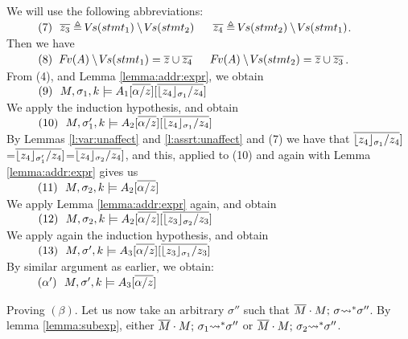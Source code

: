 {\begin{description}
We will use the following abbreviations: \\
$\SPS (7)\ \ \overline {z_3}\triangleq\vs(stmt_1)\setminus\vs(stmt_2) \ \ \ \ \ \overline {z_4}\triangleq\vs(stmt_2)\setminus\vs(stmt_1) $.\\
Then we have\\
$\SPS  (8)\ \ \fv(A)\setminus\vs(stmt_1) = \overline {z}\cup \overline{z_4}  \ \ \ \ \ 
\fv(A)\setminus\vs(stmt_2) = \overline {z}\cup\overline{z_3} $.
\\
 From (4), and Lemma \ref{lemma:addr:expr}, we obtain\\ 
 $\SPS (9) \ \ \satDAssertFrom M  {\sigma_1} k   {A_1[\overline{\alpha/z}][\overline{{\interpret {\sigma_1} {z_4}} /z_4}]}$\\
 We apply the induction hypothesis, and obtain\\
  $\SPS (10) \ \ \satDAssertFrom M  {\sigma_1'} k   {A_2[\overline{\alpha/z}][\overline{{\interpret {\sigma_1} {z_4}} /z_4}]}$\\
By Lemmas \ref{l:var:unaffect} and \ref{l:assrt:unaffect} and (7) we have that ${\overline{{\interpret {\sigma_1} {z_4}} /z_4}]}$=${\overline{{\interpret {\sigma_1'} {z_4}} /z_4}]}$=${\overline{{\interpret {\sigma_2} {z_4}} /z_4}]}$, and this, applied to (10) and again with Lemma \ref{lemma:addr:expr} gives us\\
 $\SPS (11) \ \ \satDAssertFrom M  {\sigma_2} k   {A_2[\overline{\alpha/z}]}$\\
We apply Lemma \ref{lemma:addr:expr} again, and obtain\\
 $\SPS (12) \ \ \satDAssertFrom M  {\sigma_2} k   {A_2[\overline{\alpha/z}][{\overline{{\interpret {\sigma_2} {z_3}} /z_3}}]}$\\
 We apply again the induction hypothesis, and obtain\\
  $\SPS (13) \ \ \satDAssertFrom M  {\sigma'} k   {A_3[\overline{\alpha/z}][\overline{{\interpret {\sigma_1} {z_3}} /z_3}]}$\\
By similar argument as earlier, we obtain:\\
 $\SPS (\alpha') \ \ \satDAssertFrom M  {\sigma'} k   {A_3[\overline{\alpha/z}]}$ 
 
 \vspace{.1cm}
Proving $(\beta)$.
Let us now take an arbitrary $\sigma''$ such that   $\leadstoBoundedStar  {\Mtwo\cdot M}  {\sigma}  {\sigma''}$. By
lemma  \ref{lemma:subexp}, either $\leadstoBoundedStar  {\Mtwo\cdot M}  {\sigma_1}  {\sigma''}$ or
$\leadstoBoundedStar  {\Mtwo\cdot M}  {\sigma_2}  {\sigma''}$. 


\end{description}}
